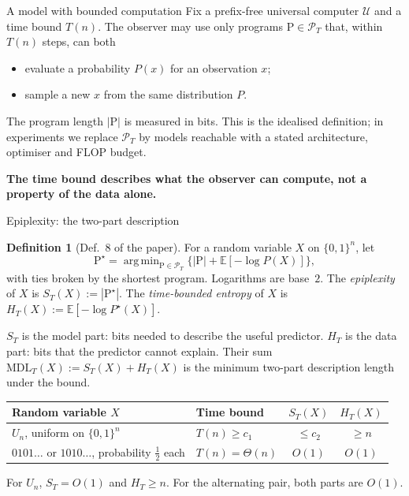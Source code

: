 \documentclass[aspectratio=169,notheorems]{beamer}
\theoremstyle{definition}
\newtheorem{definition}{Definition}
\newcommand{\E}{\mathbb{E}}
\newcommand{\MDL}{\mathrm{MDL}}
\newcommand{\PT}{\mathcal{P}_T}
\newcommand{\prog}{\mathrm{P}}
\DeclareMathOperator*{\argmin}{arg\,min}
\newcommand{\take}[1]{\par\vspace{0.35em}{\color{myblue}\hrule height 0.6pt}\vspace{0.25em}\noindent\textbf{#1}\par}
\begin{document}
\begin{frame}{A model with bounded computation}
\small
Fix a prefix-free universal computer $\mathcal U$ and a time bound $T(n)$. The observer may use only
programs $\prog\in\PT$ that, within $T(n)$ steps, can both
\begin{itemize}\setlength{\itemsep}{0.25em}
\item evaluate a probability $P(x)$ for an observation $x$;
\item sample a new $x$ from the same distribution $P$.
\end{itemize}

\medskip
The program length $|\prog|$ is measured in bits. This is the idealised definition; in experiments we
replace $\PT$ by models reachable with a stated architecture, optimiser and FLOP budget.

\medskip
\take{The time bound describes what the observer can compute, not a property of the data alone.}
\end{frame}
\begin{frame}{Epiplexity: the two-part description}
\begin{definition}[Def.~8 of the paper]\label{def:epi}
For a random variable $X$ on $\{0,1\}^n$, let
\vspace{-0.4em}
\[
\prog^\star=\argmin_{\prog\in\PT}\bigl\{|\prog|+\E[-\log P(X)]\bigr\},
\]
with ties broken by the shortest program. Logarithms are base~$2$. The \emph{epiplexity} of $X$ is $S_T(X):=|\prog^\star|$. The \emph{time-bounded entropy} of $X$ is $H_T(X):=\E[-\log P^\star(X)]$.
\end{definition}
\small
$S_T$ is the model part: bits needed to describe the useful predictor. $H_T$ is the data part: bits
that the predictor cannot explain. Their sum $\MDL_T(X):=S_T(X)+H_T(X)$ is the minimum two-part
description length under the bound.

\smallskip
\centering
\begin{tabular}{@{}llcc@{}}
\toprule
Random variable $X$ & Time bound & $S_T(X)$ & $H_T(X)$ \\
\midrule
$U_n$, uniform on $\{0,1\}^n$ & $T(n)\ge c_1$ & $\le c_2$ & $\ge n$ \\
$0101\ldots$ or $1010\ldots$, probability $\tfrac12$ each & $T(n)=\Theta(n)$ & $O(1)$ & $O(1)$ \\
\bottomrule
\end{tabular}

\smallskip
\raggedright
For $U_n$, $S_T=O(1)$ and $H_T\ge n$. For the alternating pair, both parts are $O(1)$.
\end{frame}
\end{document}
